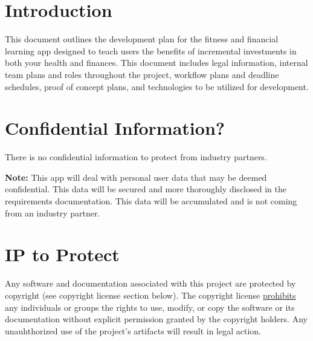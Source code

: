 \documentclass{article}
\begin{document}
\section{Introduction}

This document outlines the development plan for the fitness and financial learning app 
designed to teach users the benefits of incremental investments in both your health and finances. 
This document includes legal information, internal team plans and roles throughout the 
project, workflow plans and deadline schedules, proof of concept plans, and technologies to be 
utilized for development.



\section{Confidential Information?}

There is no confidential information to protect from industry partners.

\noindent\textbf{Note:} This app will deal with personal user data that may be deemed 
confidential. This data will be secured and more thoroughly disclosed in the 
requirements documentation. This data will be accumulated and is not coming from 
an industry partner.


\section{IP to Protect}

Any software and documentation associated with this project are protected by copyright 
(see copyright license section below). The copyright license \underline{prohibits}  
any individuals or groups the rights to use, modify, or copy the software or its documentation 
without explicit permission granted by the copyright holders. Any unauhthorized use of the project's 
artifacts will result in legal action. 
\end{document}
